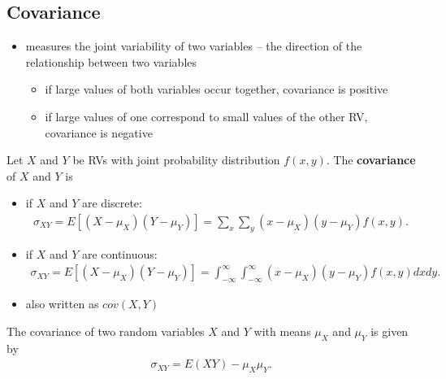 \documentclass[10pt]{article}
\begin{document}
\subsection{Covariance}
\begin{itemize}
    \item measures the joint variability of two variables -- the direction of the relationship between two variables
        \begin{itemize}
            \item if large values of both variables occur together, covariance is positive
            \item if large values of one correspond to small values of the other RV, covariance is negative
        \end{itemize}
\end{itemize}
\begin{definition}
    Let $X$ and $Y$ be RVs with joint probability distribution $f(x,y)$. The \textbf{covariance} of $X$ and $Y$ is 
    \begin{itemize}
        \item if $X$ and $Y$ are discrete:
            \begin{align*}
                \sigma_{XY} = E[(X-\mu_X)(Y-\mu_Y)] = \sum_{x} \sum_{y} (x-\mu_X)(y-\mu_Y)f(x,y)
            .\end{align*}
        \item if $X$ and $Y$ are continuous:
            \begin{align*}
                \sigma_{XY} = E[(X-\mu_X)(Y-\mu_Y)] = \int_{-\infty}^{\infty} \int_{-\infty}^{\infty} (x-\mu_X)(y-\mu_Y)f(x,y) dx dy
            .\end{align*}
    \end{itemize}
\end{definition}
\begin{itemize}
    \item also written as $cov(X,Y)$
\end{itemize}
\begin{theorem}
    The covariance of two random variables $X$ and $Y$ with means $\mu_X$ and $\mu_Y$ is given by
    \begin{align*}
        \sigma_{XY} = E(XY) - \mu_X \mu_Y
    .\end{align*}
\end{theorem}
\end{document}
